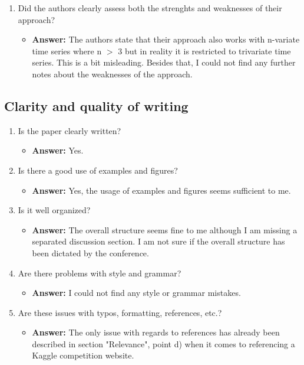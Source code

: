 \documentclass[a4paper]{article}
\begin{document}
\begin{enumerate}[label=(\alph*)]
	
	\item Did the authors clearly assess both the strenghts and weaknesses of their approach?
		\begin{itemize}
			\item \textbf{Answer:} The authors state that their approach also works with n-variate time series where n $>$ 3 but in reality it is restricted to trivariate time series. This is a bit misleading. Besides that, I could not find any further notes about the weaknesses of the approach.
		\end{itemize}		
	
\end{enumerate}

\subsection{Clarity and quality of writing}

\begin{enumerate}[label=(\alph*)]
	\item Is the paper clearly written?
		\begin{itemize}
			\item \textbf{Answer:} Yes.
		\end{itemize}			
	
	
	\item Is there a good use of examples and figures?
		\begin{itemize}
			\item \textbf{Answer:} Yes, the usage of examples and figures seems sufficient to me.
		\end{itemize}			
	
	\item Is it well organized?
		\begin{itemize}
			\item \textbf{Answer:} The overall structure seems fine to me although I am missing a separated discussion section. I am not sure if the overall structure has been dictated by the conference.
		\end{itemize}			
	
	
	\item Are there problems with style and grammar?
		\begin{itemize}
			\item \textbf{Answer:} I could not find any style or grammar mistakes.
		\end{itemize}			
	
	
	\item Are these issues with typos, formatting, references, etc.?
		\begin{itemize}
			\item \textbf{Answer:} The only issue with regards to references has already been described in section "Relevance", point d) when it comes to referencing a Kaggle competition website.
		\end{itemize}			
		
	
	
	
\end{enumerate}
\end{document}
